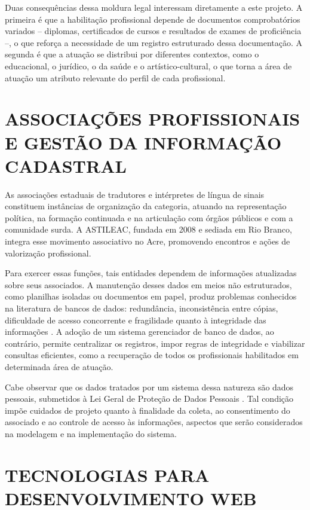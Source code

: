 \documentclass[
        oneside,      %
        english,			
        brazil			 
        ]{abntspiifac}
\begin{document}
Duas consequências dessa moldura legal interessam diretamente a este projeto. A primeira é que a habilitação profissional depende de documentos comprobatórios variados -- diplomas, certificados de cursos e resultados de exames de proficiência --, o que reforça a necessidade de um registro estruturado dessa documentação. A segunda é que a atuação se distribui por diferentes contextos, como o educacional, o jurídico, o da saúde e o artístico-cultural, o que torna a área de atuação um atributo relevante do perfil de cada profissional.

\section{ASSOCIAÇÕES PROFISSIONAIS E GESTÃO DA INFORMAÇÃO CADASTRAL}

As associações estaduais de tradutores e intérpretes de língua de sinais constituem instâncias de organização da categoria, atuando na representação política, na formação continuada e na articulação com órgãos públicos e com a comunidade surda. A ASTILEAC, fundada em 2008 e sediada em Rio Branco, integra esse movimento associativo no Acre, promovendo encontros e ações de valorização profissional.

Para exercer essas funções, tais entidades dependem de informações atualizadas sobre seus associados. A manutenção desses dados em meios não estruturados, como planilhas isoladas ou documentos em papel, produz problemas conhecidos na literatura de bancos de dados: redundância, inconsistência entre cópias, dificuldade de acesso concorrente e fragilidade quanto à integridade das informações \citep{elmasri2019sistemas}. A adoção de um sistema gerenciador de banco de dados, ao contrário, permite centralizar os registros, impor regras de integridade e viabilizar consultas eficientes, como a recuperação de todos os profissionais habilitados em determinada área de atuação.

Cabe observar que os dados tratados por um sistema dessa natureza são dados pessoais, submetidos à Lei Geral de Proteção de Dados Pessoais \citep{brasil2018lgpd}. Tal condição impõe cuidados de projeto quanto à finalidade da coleta, ao consentimento do associado e ao controle de acesso às informações, aspectos que serão considerados na modelagem e na implementação do sistema.

\section{TECNOLOGIAS PARA DESENVOLVIMENTO WEB}
\end{document}
